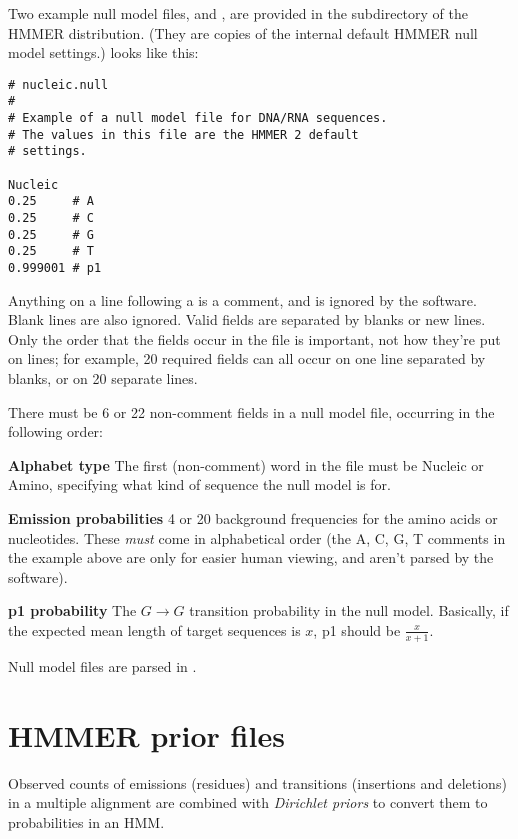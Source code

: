 Two example null model files,
 and , are provided
in the  subdirectory of the HMMER distribution. (They 
are copies of the internal default HMMER null model settings.)
 looks like this:

{\small\begin{verbatim}
# nucleic.null
#
# Example of a null model file for DNA/RNA sequences.
# The values in this file are the HMMER 2 default
# settings.

Nucleic
0.25     # A
0.25     # C
0.25     # G
0.25     # T
0.999001 # p1
\end{verbatim}}

Anything on a line following a \prog{\#} is a comment, and is ignored
by the software. Blank lines are also ignored. Valid fields are
separated by blanks or new lines. Only the order that the fields occur
in the file is important, not how they're put on lines; for example,
20 required fields can all occur on one line separated by blanks, or
on 20 separate lines. 

There must be 6 or 22 non-comment fields in a null model file,
occurring in the following order:

\begin{wideitem}
\item [\textbf{Alphabet type}] The first (non-comment) word in the
file must be Nucleic or Amino, specifying what kind of sequence the
null model is for.

\item [\textbf{Emission probabilities}] 4 or 20 background
frequencies for the amino acids or nucleotides. These \textit{must}
come in alphabetical order (the A, C, G, T comments in the example
above are only for easier human viewing, and aren't parsed by the
software).

\item [\textbf{p1 probability}] The $G \rightarrow G$ transition
probability in the null model. Basically, if the expected mean length
of target sequences is $x$, p1 should be $\frac{x}{x+1}$.
\end{wideitem}

Null model files are parsed in .

\section {HMMER prior files}

Observed counts of emissions (residues) and transitions (insertions
and deletions) in a multiple alignment are combined with
\textit{Dirichlet priors} to convert them to probabilities
in an HMM. 


